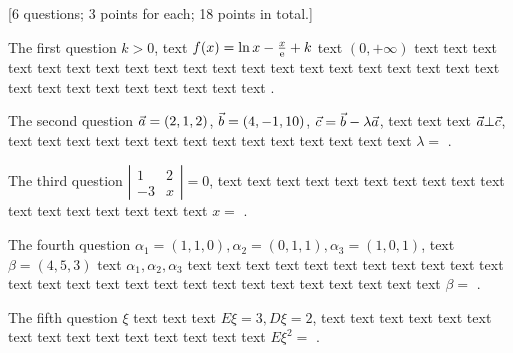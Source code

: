 \documentclass[12pt,math=all]{randexam}
\begin{document}

\gradetable[total=4]

[6 questions; 3 points for each; 18 points in total.]

\answertable[total=6,column=3,strut=3em]

\begin{question}
The first question $k>0$, text $f(x)=\ln x-\frac{x}{\mathrm{e}}+k$ text $(0,+\infty)$
text text text text text text text text text text text text text text text text
text text text text text text text text text text text text text .
\end{question}

\bigskip

\begin{question}
The second question $\vec{a}=(2,1,2)$, $\vec{b}=(4,-1,10)$, $\vec{c}=\vec{b}-\lambda\vec{a}$,
text text text $\vec{a}\bot\vec{c}$, text text text text text text text text text
text text text text text $\lambda=$ .
\end{question}

\bigskip

\begin{question}
The third question $\left|\begin{array}{cc}
  1  & 2\\
  -3 & x
\end{array}\right|=0$, text text text text text text text text
text text text text text text text text text $x=$ .
\end{question}

\bigskip

\begin{question}
The fourth question $\alpha_1=(1,1,0), \alpha_2=(0,1,1), \alpha_3=(1,0,1)$,
text $\beta=(4, 5, 3)$ text $\alpha_1, \alpha_2, \alpha_3$ text text text text 
text text text text text text text text text text text text text text text text
text text text text text text $\beta=$ .
\end{question}

\bigskip

\begin{question}%
The fifth question $\xi$ text text text $E\xi=3, D\xi=2$, text text text text text
text text text text text text text text text text $E\xi^2=$ .
\end{question}
\end{document}

